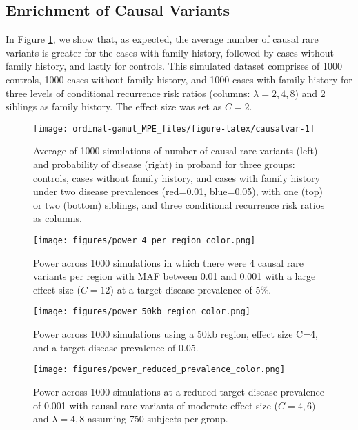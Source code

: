 \documentclass[]{article}
\begin{document}
\hypertarget{enrichment-of-causal-variants}{%
\subsection*{Enrichment of Causal Variants}\label{enrichment-of-causal-variants}}

In Figure \ref{fig:causalvar}, we show that, as expected, the average number of causal rare variants is greater for the cases with family history, followed by cases without family history, and lastly for controls. This simulated dataset comprises of 1000 controls, 1000 cases without family history, and 1000 cases with family history for three levels of conditional recurrence risk ratios (columns: \(\lambda=2,4,8\)) and 2 siblings as family history. The effect size was set as \(C=2\).

\begin{figure}[H]

{\centering \texttt{[image: ordinal-gamut\_MPE\_files/figure-latex/causalvar-1]} 

}

\caption{Average of 1000 simulations of number of causal rare variants (left) and probability of disease (right) in proband for three groups: controls, cases without family history, and cases with family history under two disease prevalences (red=0.01, blue=0.05), with one (top) or two (bottom) siblings, and three conditional recurrence risk ratios as columns.}\label{fig:causalvar}
\end{figure}

\begin{figure}[ht]
\centering
\texttt{[image: figures/power\_4\_per\_region\_color.png]}
\caption{Power across 1000 simulations in which there were 4 causal rare variants per region with MAF between 0.01 and 0.001 with a large effect size ($C=12$) at a target disease prevalence of 5\%.}
\label{fig6}
\end{figure}

\begin{figure}[ht]
\centering
\texttt{[image: figures/power\_50kb\_region\_color.png]}
\caption{Power across 1000 simulations using a 50kb region, effect size C=4, and a target disease prevalence of 0.05.}
\label{fig7}
\end{figure}

\begin{figure}[ht]
\centering
\texttt{[image: figures/power\_reduced\_prevalence\_color.png]}
\caption{Power across 1000 simulations at a reduced target disease prevalence of 0.001 with causal rare variants of moderate effect size ($C=4,6)$ and $\lambda=4,8$ assuming 750 subjects per group.}
\label{fig8}
\end{figure}

\clearpage


\end{document}
